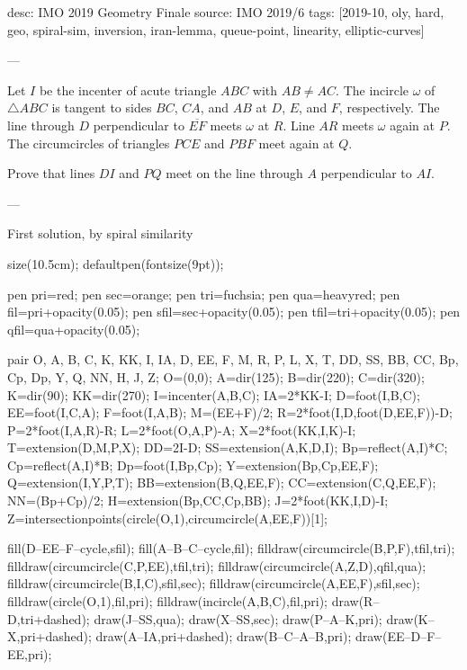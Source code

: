 desc: IMO 2019 Geometry Finale
source: IMO 2019/6
tags: [2019-10, oly, hard, geo, spiral-sim, inversion, iran-lemma, queue-point, linearity, elliptic-curves]

---

Let $I$ be the incenter of acute triangle $ABC$ with $AB\neq AC$. The incircle $\omega$ of $\triangle ABC$ is tangent to sides $BC$, $CA$, and $AB$ at $D$, $E$, and $F$, respectively. The line through $D$ perpendicular to $\overline{EF}$ meets $\omega$ at $R$. Line $AR$ meets $\omega$ again at $P$. The circumcircles of triangles $PCE$ and $PBF$ meet again at $Q$.

Prove that lines $DI$ and $PQ$ meet on the line through $A$ perpendicular to $AI$.

---

\begin{customenv}{First solution, by spiral similarity}\
    \begin{center}
        \begin{asy}
            size(10.5cm);
            defaultpen(fontsize(9pt));

            pen pri=red;
            pen sec=orange;
            pen tri=fuchsia;
            pen qua=heavyred;
            pen fil=pri+opacity(0.05);
            pen sfil=sec+opacity(0.05);
            pen tfil=tri+opacity(0.05);
            pen qfil=qua+opacity(0.05);

            pair O, A, B, C, K, KK, I, IA, D, EE, F, M, R, P, L, X, T, DD, SS, BB, CC, Bp, Cp, Dp, Y, Q, NN, H, J, Z;
            O=(0,0);
            A=dir(125);
            B=dir(220);
            C=dir(320);
            K=dir(90);
            KK=dir(270);
            I=incenter(A,B,C);
            IA=2*KK-I;
            D=foot(I,B,C);
            EE=foot(I,C,A);
            F=foot(I,A,B);
            M=(EE+F)/2;
            R=2*foot(I,D,foot(D,EE,F))-D;
            P=2*foot(I,A,R)-R;
            L=2*foot(O,A,P)-A;
            X=2*foot(KK,I,K)-I;
            T=extension(D,M,P,X);
            DD=2I-D;
            SS=extension(A,K,D,I);
            Bp=reflect(A,I)*C;
            Cp=reflect(A,I)*B;
            Dp=foot(I,Bp,Cp);
            Y=extension(Bp,Cp,EE,F);
            Q=extension(I,Y,P,T);
            BB=extension(B,Q,EE,F);
            CC=extension(C,Q,EE,F);
            NN=(Bp+Cp)/2;
            H=extension(Bp,CC,Cp,BB);
            J=2*foot(KK,I,D)-I;
            Z=intersectionpoints(circle(O,1),circumcircle(A,EE,F))[1];

            fill(D--EE--F--cycle,sfil);
            fill(A--B--C--cycle,fil);
            filldraw(circumcircle(B,P,F),tfil,tri);
            filldraw(circumcircle(C,P,EE),tfil,tri);
            filldraw(circumcircle(A,Z,D),qfil,qua);
            filldraw(circumcircle(B,I,C),sfil,sec);
            filldraw(circumcircle(A,EE,F),sfil,sec);
            filldraw(circle(O,1),fil,pri);
            filldraw(incircle(A,B,C),fil,pri);
            draw(R--D,tri+dashed);
            draw(J--SS,qua);
            draw(X--SS,sec);
            draw(P--A--K,pri);
            draw(K--X,pri+dashed);
            draw(A--IA,pri+dashed);
            draw(B--C--A--B,pri);
            draw(EE--D--F--EE,pri);


\end{asy}
\end{center}
\end{customenv}
